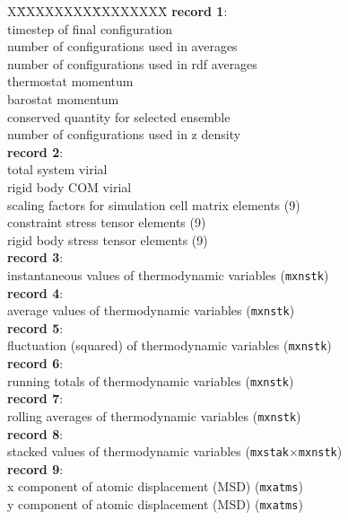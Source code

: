 \begin{tabbing}
X\=XXXXXXXX\=XXXXXXXX\=\kill
{\bf record 1}:\\ 
 \>  timestep of final configuration\\
\>  number of configurations used in averages\\
\>  number of configurations used in rdf averages\\
\>  thermostat momentum\\
\>  barostat momentum\\
\>  conserved quantity for selected ensemble \\
\>  number of configurations used in z density\\
{\bf record 2}:\\
\> total system virial \\
\> rigid body COM virial \\
\> scaling factors for simulation cell matrix elements (9)\\
\> constraint stress tensor elements (9) \\
\> rigid body stress tensor elements (9) \\
{\bf record 3}:\\
\>  instantaneous values of thermodynamic variables
({\tt mxnstk})\\
{\bf record 4}:\\
\>  average values of thermodynamic variables
({\tt mxnstk})\\
{\bf record 5}:\\
\>  fluctuation (squared) of thermodynamic variables
({\tt mxnstk})\\
{\bf record 6}:\\
\>  running totals of thermodynamic variables
({\tt mxnstk})\\
{\bf record 7}:\\
\>  rolling averages of thermodynamic variables
({\tt mxnstk})\\
{\bf record 8}:\\
\>  stacked values of thermodynamic variables
({\tt mxstak}$\times${\tt mxnstk})\\
{\bf record 9}:\\
\> x component of atomic displacement (MSD) ({\tt mxatms})\\
\> y component of atomic displacement (MSD) ({\tt mxatms})\\

\end{tabbing}
